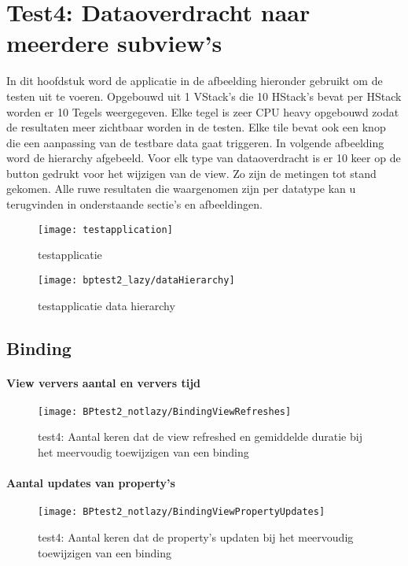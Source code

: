 \section{Test4: Dataoverdracht naar meerdere subview's}
In dit hoofdstuk word de applicatie in de afbeelding hieronder gebruikt om de testen uit te voeren. Opgebouwd uit 1 VStack's die 10 HStack's bevat per HStack worden er 10 Tegels weergegeven. Elke tegel is zeer CPU heavy opgebouwd zodat de resultaten meer zichtbaar worden in de testen. Elke tile bevat ook een knop die een aanpassing van de testbare data gaat triggeren. In volgende afbeelding word de hierarchy afgebeeld. Voor elk type van dataoverdracht is er 10 keer op de button gedrukt voor het wijzigen van de view. Zo zijn de metingen tot stand gekomen. Alle ruwe resultaten die waargenomen zijn per datatype kan u terugvinden in onderstaande sectie's en afbeeldingen.
\begin{figure}[htbp]
    \centering
    \texttt{[image: testapplication]} 
    \caption{testapplicatie}
    \label{fig:testapplication3}
\end{figure}
\begin{figure}[htbp]
    \centering
    \texttt{[image: bptest2\_lazy/dataHierarchy]} 
    \caption{testapplicatie data hierarchy}
    \label{fig:testapplicationHierarchy3}
\end{figure}
\subsection{Binding}
\paragraph{View ververs aantal en ververs tijd}
\begin{figure}[H]
    \centering
    \texttt{[image: BPtest2\_notlazy/BindingViewRefreshes]} 
    \caption{test4: Aantal keren dat de view refreshed en gemiddelde duratie bij het meervoudig toewijzigen van een binding}
    \label{fig:viewRefreshesBinding3}
\end{figure}
\paragraph{Aantal updates van property's}
\begin{figure}[H]
    \centering
    \texttt{[image: BPtest2\_notlazy/BindingViewPropertyUpdates]} 
    \caption{test4: Aantal keren dat de property's updaten bij het meervoudig toewijzigen van een binding}
    \label{fig:propertyUpdatesBinding3}
\end{figure}

